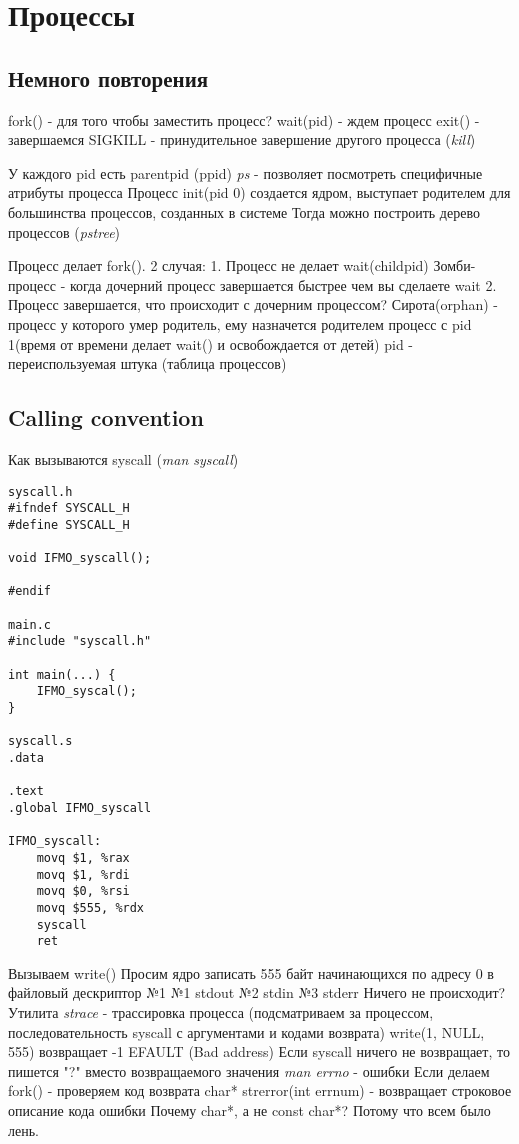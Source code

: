 \documentclass[../lectures.tex]{subfiles}
\begin{document}
\chapter{Процессы}


\section{Немного повторения}
fork() - для того чтобы заместить процесс?
wait(pid) - ждем процесс
exit() - завершаемся
SIGKILL - принудительное завершение другого процесса (\emph{kill})

У каждого pid есть parentpid (ppid)
\emph{ps} - позволяет посмотреть специфичные атрибуты процесса
Процесс init(pid 0) создается ядром, выступает родителем для большинства процессов, созданных в системе
Тогда можно построить дерево процессов (\emph{pstree})

Процесс делает fork(). 2 случая:
1. Процесс не делает wait(childpid)
Зомби-процесс - когда дочерний процесс завершается быстрее чем вы сделаете wait
2. Процесс завершается, что происходит с дочерним процессом?
Сирота(orphan) - процесс у которого умер родитель, ему назначется родителем процесс с pid 1(время от времени делает wait() и освобождается от детей)
pid - переиспользуемая штука (таблица процессов)

\section{Calling convention}
Как вызываются syscall (\emph{man syscall})
\begin{lstlisting}
syscall.h
#ifndef SYSCALL_H
#define SYSCALL_H

void IFMO_syscall();

#endif

main.c
#include "syscall.h"

int main(...) {
    IFMO_syscal();
}

syscall.s
.data

.text
.global IFMO_syscall

IFMO_syscall:
    movq $1, %rax
    movq $1, %rdi
    movq $0, %rsi
    movq $555, %rdx
    syscall
    ret
\end{lstlisting}

Вызываем write()
Просим ядро записать 555 байт начинающихся по адресу 0 в файловый дескриптор №1
№1 stdout
№2 stdin
№3 stderr
Ничего не происходит?
Утилита \emph{strace} - трассировка процесса (подсматриваем за процессом, последовательность syscall с аргументами и кодами возврата)
write(1, NULL, 555) возвращает -1 EFAULT (Bad address)
Если syscall ничего не возвращает, то пишется "?" вместо возвращаемого значения
\emph{man errno} - ошибки
Если делаем fork() - проверяем код возврата
char* strerror(int errnum) - возвращает строковое описание кода ошибки
Почему char*, а не const char*? Потому что всем было лень.
\end{document}
